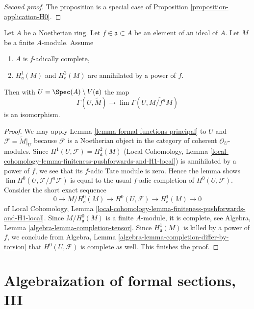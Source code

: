 \begin{proof}[Second proof]
The proposition is a special case of
Proposition \ref{proposition-application-H0}.
\end{proof}

\begin{lemma}
\label{lemma-alternative-H0}
Let $A$ be a Noetherian ring. Let $f \in \mathfrak a \subset A$
be an element of an ideal of $A$. Let $M$ be a finite $A$-module.
Assume
\begin{enumerate}
\item $A$ is $f$-adically complete,
\item $H^1_\mathfrak a(M)$ and $H^2_\mathfrak a(M)$ are
annihilated by a power of $f$.
\end{enumerate}
Then with $U = \Spec(A) \setminus V(\mathfrak a)$ the map
$$
\Gamma(U, \widetilde{M})
\longrightarrow
\lim \Gamma(U, \widetilde{M/f^nM})
$$
is an isomorphism.
\end{lemma}

\begin{proof}
We may apply Lemma \ref{lemma-formal-functions-principal} to $U$ and
$\mathcal{F} = \widetilde{M}|_U$ because $\mathcal{F}$ is a Noetherian object in
the category of coherent $\mathcal{O}_U$-modules.
Since $H^1(U, \mathcal{F}) = H^2_\mathfrak a(M)$
(Local Cohomology, Lemma
\ref{local-cohomology-lemma-finiteness-pushforwards-and-H1-local})
is annihilated by a power of $f$, we see that
its $f$-adic Tate module is zero.
Hence the lemma shows $\lim H^0(U, \mathcal{F}/f^n \mathcal{F})$
is equal to the usual $f$-adic completion of $H^0(U, \mathcal{F})$.
Consider the short exact sequence
$$
0 \to M/H^0_\mathfrak a(M) \to H^0(U, \mathcal{F}) \to H^1_\mathfrak a(M) \to 0
$$
of Local Cohomology, Lemma
\ref{local-cohomology-lemma-finiteness-pushforwards-and-H1-local}.
Since $M/H^0_\mathfrak a(M)$ is a finite $A$-module, it is
complete, see Algebra, Lemma \ref{algebra-lemma-completion-tensor}.
Since $H^1_\mathfrak a(M)$ is killed by a power of $f$, we conclude
from Algebra, Lemma \ref{algebra-lemma-completion-differ-by-torsion}
that $H^0(U, \mathcal{F})$ is complete as well. This finishes the proof.
\end{proof}







\section{Algebraization of formal sections, III}
\label{section-algebraization-sections-coherent-III}

